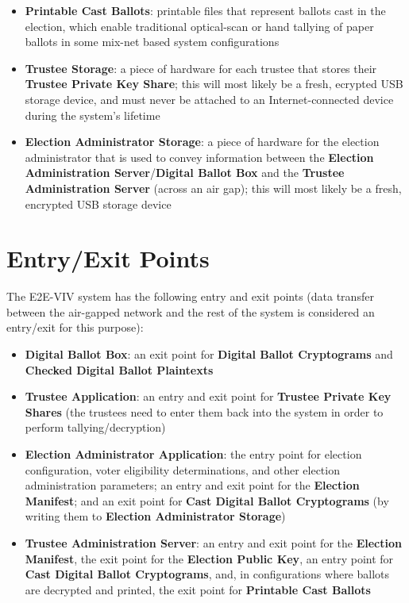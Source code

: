 \documentclass[10pt,letterpaper]{article}
\begin{document}
\begin{itemize}
    \item \textbf{Printable Cast Ballots}: printable files that represent ballots cast in the election, which enable traditional optical-scan or hand tallying of paper ballots in some mix-net based system configurations

    \item \textbf{Trustee Storage}: a piece of hardware for each trustee that stores their \textbf{Trustee Private Key Share}; this will most likely be a fresh, ecrypted USB storage device, and must never be attached to an Internet-connected device during the system's lifetime

    \item \textbf{Election Administrator Storage}: a piece of hardware for the election administrator that is used to convey information between the \textbf{Election Administration Server}/\textbf{Digital Ballot Box} and the \textbf{Trustee Administration Server} (across an air gap); this will most likely be a fresh, encrypted USB storage device

\end{itemize}

\section{Entry/Exit Points}

The E2E-VIV system has the following entry and exit points (data transfer between the air-gapped network and the rest of the system is considered an entry/exit for this purpose):

\begin{itemize}

    \item \textbf{Digital Ballot Box}: an exit point for \textbf{Digital Ballot Cryptograms} and  \textbf{Checked Digital Ballot Plaintexts}

    \item \textbf{Trustee Application}: an entry and exit point for \textbf{Trustee Private Key Shares} (the trustees need to enter them back into the system in order to perform tallying/decryption)

    \item \textbf{Election Administrator Application}: the entry point for election configuration, voter eligibility determinations, and other election administration parameters; an entry and exit point for the \textbf{Election Manifest}; and an exit point for \textbf{Cast Digital Ballot Cryptograms} (by writing them to \textbf{Election Administrator Storage})

    \item \textbf{Trustee Administration Server}: an entry and exit point for the \textbf{Election Manifest}, the exit point for the \textbf{Election Public Key}, an entry point for \textbf{Cast Digital Ballot Cryptograms}, and, in configurations where ballots are decrypted and printed, the exit point for \textbf{Printable Cast Ballots}

\end{itemize}
\end{document}
